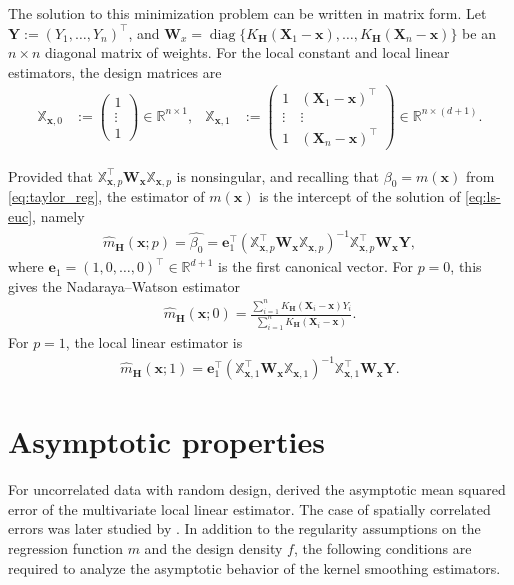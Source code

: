 \documentclass[12pt]{report} %
\newcommand{\bH}{\mathbf{H}}
\newcommand{\bX}{\mathbf{X}}
\newcommand{\bx}{\mathbf{x}}
\newcommand{\bY}{\mathbf{Y}}
\newcommand{\be}{\mathbf{e}}
\begin{document}
The solution to this minimization problem can be written in matrix form. Let $\bY:=(Y_1,\ldots,Y_n)^\top$, and $\boldsymbol{W}_{x} = \operatorname{diag}\{K_{\bH}(\bX_1 - \bx), \dots, K_{\bH}(\bX_n - \bx)\}$ be an $n \times n$ diagonal matrix of weights.  For the local constant and local linear estimators, the design matrices are
\begin{align*}
    \mathbb{X}_{\bx,0}&:=
    \begin{pmatrix}
        1 \\
        \vdots \\
        1
    \end{pmatrix}
    \in \mathbb{R}^{n\times 1},
    &
    \mathbb{X}_{\bx,1} &:=
    \begin{pmatrix}
        1 & (\bX_1-\bx)^\top \\
        \vdots & \vdots \\
        1 & (\bX_n-\bx)^\top
    \end{pmatrix}
    \in \mathbb{R}^{n\times(d+1)}.
\end{align*}

Provided that $\mathbb{X}_{\bx,p}^\top\boldsymbol{W}_{\bx}
\mathbb{X}_{\bx,p}$ is nonsingular, and recalling that $\beta_0 = m(\bx)$ from \eqref{eq:taylor_reg}, the estimator of $m(\bx)$ is the intercept of the solution of \eqref{eq:ls-euc}, namely
\begin{align*}
    \hat{m}_{\bH}(\bx;p) = \hat{\beta_0} = \be_{1}^\top \left(\mathbb{X}_{\bx,p}^\top\boldsymbol{W}_{\bx}\mathbb{X}_{\bx,p}
    \right)^{-1} \mathbb{X}_{\bx,p}^\top\boldsymbol{W}_{\bx}\bY,
\end{align*}
where $\be_1=(1,0,\ldots,0)^\top\in\mathbb{R}^{d+1}$ is the first canonical vector. For $p=0$, this gives the Nadaraya--Watson estimator
\begin{align}
    \label{eq:NW-multi}
    \hat{m}_{\bH}(\bx;0) =
    \frac{\sum_{i=1}^{n} K_{\bH}(\bX_i-\bx)Y_i}
    {\sum_{i=1}^{n} K_{\bH}(\bX_i-\bx)}.
\end{align}
For $p=1$, the local linear estimator is
\begin{align}
\label{eq:LL-multi}
    \hat{m}_{\bH}(\bx;1)= \be_1^{\top}
    \left(\mathbb{X}_{\bx,1}^\top
        \boldsymbol{W}_{\bx}
        \mathbb{X}_{\bx,1}
    \right)^{-1}
    \mathbb{X}_{\bx,1}^\top\boldsymbol{W}_{\bx}\bY.
\end{align}


\section{Asymptotic properties} \label{sec:Eucl-spat-asymp}
For uncorrelated data with random design, \citet{ruppert1994multivariate} derived the asymptotic mean squared error of the multivariate local linear estimator. The case of spatially correlated errors was later studied by \citet{Liu2001}. In addition to the regularity assumptions on the regression function $m$ and the design density $f$, the following conditions are required to analyze the asymptotic behavior of the kernel smoothing estimators.
\end{document}
